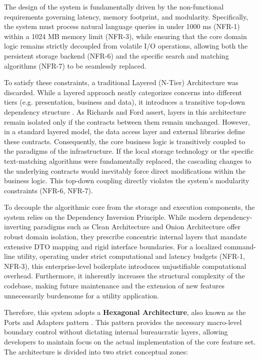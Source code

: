 The design of the system is fundamentally driven by the non-functional requirements governing latency, memory footprint, and modularity. Specifically, the system must process natural language queries in under 1000 ms (NFR-1) within a 1024 MB memory limit (NFR-3), while ensuring that the core domain logic remains strictly decoupled from volatile \ac{I/O} operations, allowing both the persistent storage backend (NFR-6) and the specific search and matching algorithms (NFR-7) to be seamlessly replaced.

To satisfy these constraints, a traditional Layered (N-Tier) Architecture was discarded. While a layered approach neatly categorizes concerns into different tiers (e.g. presentation, business and data), it introduces a transitive top-down dependency structure \cite{richards2020fundamentals}. As Richards and Ford assert, layers in this architecture remain isolated only if the contracts between them remain unchanged. However, in a standard layered model, the data access layer and external libraries define these contracts. Consequently, the core business logic is transitively coupled to the paradigms of the infrastructure. If the local storage technology or the specific text-matching algorithms were fundamentally replaced, the cascading changes to the underlying contracts would inevitably force direct modifications within the business logic. This top-down coupling directly violates the system's modularity constraints (NFR-6, NFR-7).

To decouple the algorithmic core from the storage and execution components, the system relies on the Dependency Inversion Principle. While modern dependency-inverting paradigms such as Clean Architecture \cite{martin2017clean} and Onion Architecture \cite{palermo2008onion} offer robust domain isolation, they prescribe concentric internal layers that mandate extensive \ac{DTO} mapping and rigid interface boundaries. For a localized command-line utility, operating under strict computational and latency budgets (NFR-1, NFR-3), this enterprise-level boilerplate introduces unjustifiable computational overhead. Furthermore, it inherently increases the structural complexity of the codebase, making future maintenance and the extension of new features unnecessarily burdensome for a utility application.

Therefore, this system adopts a \textbf{Hexagonal Architecture}, also known as the Ports and Adapters pattern \cite{cockburn2005hexagonal}. This pattern provides the necessary macro-level boundary control without dictating internal bureaucratic layers, allowing developers to maintain focus on the actual implementation of the core feature set. The architecture is divided into two strict conceptual zones:

